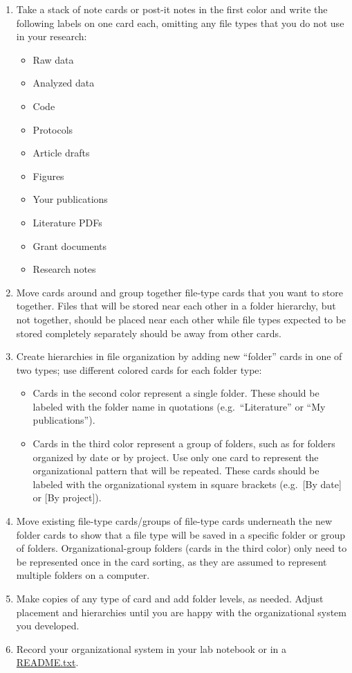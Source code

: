 \documentclass[
]{book}
\providecommand{\tightlist}{%
  \setlength{\itemsep}{0pt}\setlength{\parskip}{0pt}}
\begin{document}
\begin{enumerate}
\def\labelenumi{\arabic{enumi}.}
\tightlist
\item
  Take a stack of note cards or post-it notes in the first color and write the following labels on one card each, omitting any file types that you do not use in your research:

  \begin{itemize}
  \tightlist
  \item
    Raw data
  \item
    Analyzed data
  \item
    Code
  \item
    Protocols
  \item
    Article drafts
  \item
    Figures
  \item
    Your publications
  \item
    Literature PDFs
  \item
    Grant documents
  \item
    Research notes
  \end{itemize}
\item
  Move cards around and group together file-type cards that you want to store together. Files that will be stored near each other in a folder hierarchy, but not together, should be placed near each other while file types expected to be stored completely separately should be away from other cards.
\item
  Create hierarchies in file organization by adding new ``folder'' cards in one of two types; use different colored cards for each folder type:

  \begin{itemize}
  \tightlist
  \item
    Cards in the second color represent a single folder. These should be labeled with the folder name in quotations (e.g.~``Literature'' or ``My publications'').
  \item
    Cards in the third color represent a group of folders, such as for folders organized by date or by project. Use only one card to represent the organizational pattern that will be repeated. These cards should be labeled with the organizational system in square brackets (e.g.~{[}By date{]} or {[}By project{]}).
  \end{itemize}
\item
  Move existing file-type cards/groups of file-type cards underneath the new folder cards to show that a file type will be saved in a specific folder or group of folders. Organizational-group folders (cards in the third color) only need to be represented once in the card sorting, as they are assumed to represent multiple folders on a computer.
\item
  Make copies of any type of card and add folder levels, as needed. Adjust placement and hierarchies until you are happy with the organizational system you developed.
\item
  Record your organizational system in your lab notebook or in a \protect\hyperlink{readme-txt}{README.txt}.
\end{enumerate}
\end{document}
